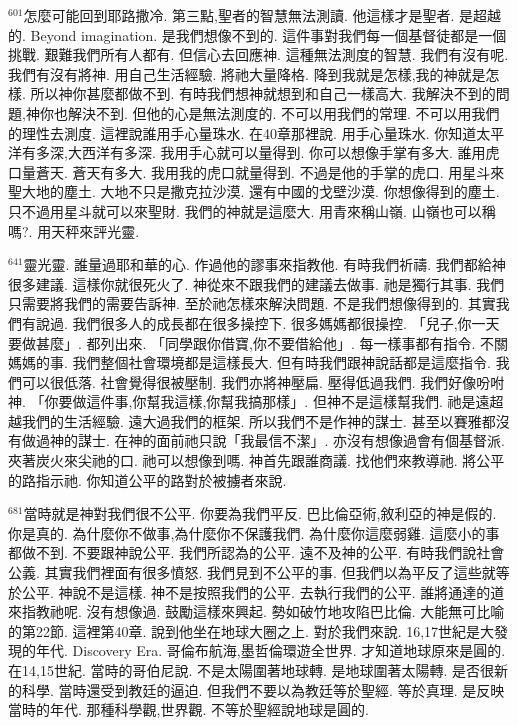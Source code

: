 \documentclass{book}
\begin{document}
$^{601}$怎麼可能回到耶路撒冷.
第三點,聖者的智慧無法測讀.
他這樣才是聖者.
是超越的.
Beyond imagination.
是我們想像不到的.
這件事對我們每一個基督徒都是一個挑戰.
艱難我們所有人都有.
但信心去回應神.
這種無法測度的智慧.
我們有沒有呢.
我們有沒有將神.
用自己生活經驗.
將祂大量降格.
降到我就是怎樣,我的神就是怎樣.
所以神你甚麼都做不到.
有時我們想神就想到和自己一樣高大.
我解決不到的問題,神你也解決不到.
但他的心是無法測度的.
不可以用我們的常理.
不可以用我們的理性去測度.
這裡說誰用手心量珠水.
在40章那裡說.
用手心量珠水.
你知道太平洋有多深,大西洋有多深.
我用手心就可以量得到.
你可以想像手掌有多大.
誰用虎口量蒼天.
蒼天有多大.
我用我的虎口就量得到.
不過是他的手掌的虎口.
用星斗來聖大地的塵土.
大地不只是撒克拉沙漠.
還有中國的戈壁沙漠.
你想像得到的塵土.
只不過用星斗就可以來聖財.
我們的神就是這麼大.
用青來稱山嶺.
山嶺也可以稱嗎?.
用天秤來評光靈.

$^{641}$靈光靈.
誰量過耶和華的心.
作過他的謬事來指教他.
有時我們祈禱.
我們都給神很多建議.
這樣你就很死火了.
神從來不跟我們的建議去做事.
祂是獨行其事.
我們只需要將我們的需要告訴神.
至於祂怎樣來解決問題.
不是我們想像得到的.
其實我們有說過.
我們很多人的成長都在很多操控下.
很多媽媽都很操控.
「兒子,你一天要做甚麼」.
都列出來.
「同學跟你借寶,你不要借給他」.
每一樣事都有指令.
不關媽媽的事.
我們整個社會環境都是這樣長大.
但有時我們跟神說話都是這麼指令.
我們可以很低落.
社會覺得很被壓制.
我們亦將神壓扁.
壓得低過我們.
我們好像吩咐神.
「你要做這件事,你幫我這樣,你幫我搞那樣」.
但神不是這樣幫我們.
祂是遠超越我們的生活經驗.
遠大過我們的框架.
所以我們不是作神的謀士.
甚至以賽雅都沒有做過神的謀士.
在神的面前祂只說「我最信不潔」.
亦沒有想像過會有個基督派.
夾著炭火來尖祂的口.
祂可以想像到嗎.
神首先跟誰商議.
找他們來教導祂.
將公平的路指示祂.
你知道公平的路對於被擄者來說.

$^{681}$當時就是神對我們很不公平.
你要為我們平反.
巴比倫亞術,敘利亞的神是假的.
你是真的.
為什麼你不做事,為什麼你不保護我們.
為什麼你這麼弱雞.
這麼小的事都做不到.
不要跟神說公平.
我們所認為的公平.
遠不及神的公平.
有時我們說社會公義.
其實我們裡面有很多憤怒.
我們見到不公平的事.
但我們以為平反了這些就等於公平.
神說不是這樣.
神不是按照我們的公平.
去執行我們的公平.
誰將通達的道來指教祂呢.
沒有想像過.
鼓勵這樣來興起.
勢如破竹地攻陷巴比倫.
大能無可比喻的第22節.
這裡第40章.
說到他坐在地球大圈之上.
對於我們來說.
16,17世紀是大發現的年代.
Discovery Era.
哥倫布航海,墨哲倫環遊全世界.
才知道地球原來是圓的.
在14,15世紀.
當時的哥伯尼說.
不是太陽圍著地球轉.
是地球圍著太陽轉.
是否很新的科學.
當時還受到教廷的逼迫.
但我們不要以為教廷等於聖經.
等於真理.
是反映當時的年代.
那種科學觀,世界觀.
不等於聖經說地球是圓的.
\end{document}
